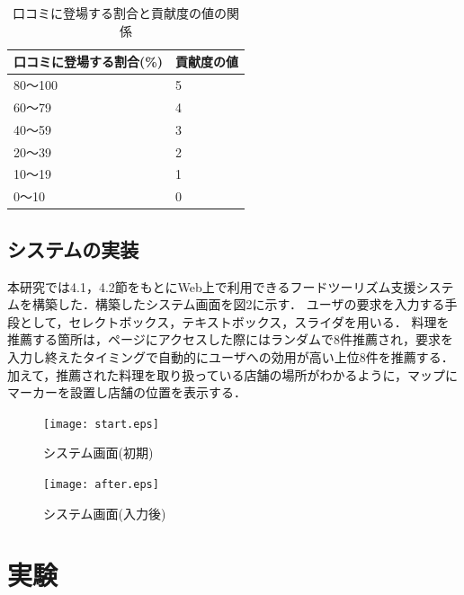 \documentclass{funthesis}
\begin{document}
\begin{table}[htb]
  \begin{center}
  \scriptsize
    \caption{口コミに登場する割合と貢献度の値の関係}
    \normalsize
   \begin{tabular}{p{6cm}|p{6cm}}
    \hline
口コミに登場する割合(\%) & 貢献度の値 \\ \hline\hline
      80〜100 & 5  \\ \hline
      60〜79 & 4 \\ \hline
      40〜59 & 3 \\ \hline
      20〜39 & 2 \\ \hline
      10〜19 & 1 \\ \hline
      0〜10 & 0 \\ \hline
  \end{tabular}
  \end{center}
\end{table}

\section{システムの実装}
本研究では4.1，4.2節をもとにWeb上で利用できるフードツーリズム支援システムを構築した．構築したシステム画面を図2に示す．
ユーザの要求を入力する手段として，セレクトボックス，テキストボックス，スライダを用いる．
料理を推薦する箇所は，ページにアクセスした際にはランダムで8件推薦され，要求を入力し終えたタイミングで自動的にユーザへの効用が高い上位8件を推薦する．
加えて，推薦された料理を取り扱っている店舗の場所がわかるように，マップにマーカーを設置し店舗の位置を表示する．

\begin{figure}[tbp]
  \begin{center}
    \texttt{[image: start.eps]}
    \caption{システム画面(初期)}
  \end{center}
\end{figure}

\newpage

\begin{figure}[tbp]
  \begin{center}
    \texttt{[image: after.eps]}
    \caption{システム画面(入力後)}
  \end{center}
\end{figure}

\chapter{実験}
\end{document}
